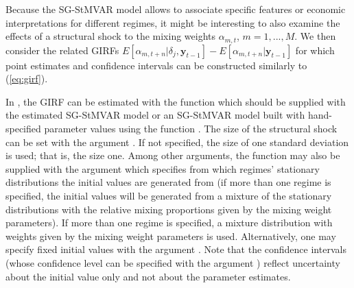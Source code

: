 \documentclass[nojss]{jss} %
\begin{document}
Because the SG-StMVAR model allows to associate specific features or economic interpretations for different regimes, it might be interesting to also examine the effects of a structural shock to the mixing weights $\alpha_{m,t}$, $m=1,...,M$. We then consider the related GIRFs $E[\alpha_{m,t+n}|\delta_j,\boldsymbol{y}_{t-1}] - E[\alpha_{m,t+n}|\boldsymbol{y}_{t-1}]$ for which point estimates and confidence intervals can be constructed similarly to (\ref{eq:girf}).

In , the GIRF can be estimated with the function  which should be supplied with the estimated SG-StMVAR model or an SG-StMVAR model built with hand-specified parameter values using the function . The size of the structural shock can be set with the argument . If not specified, the size of one standard deviation is used; that is, the size one. Among other arguments, the function may also be supplied with the argument  which specifies from which regimes' stationary distributions the initial values are generated from (if more than one regime is specified, the initial values will be generated from a mixture of the stationary distributions with the relative mixing proportions given by the mixing weight parameters). If more than one regime is specified, a mixture distribution with weights given by the mixing weight parameters is used. Alternatively, one may specify fixed initial values with the argument . Note that the confidence intervals (whose confidence level can be specified with the argument ) reflect uncertainty about the initial value only and not about the parameter estimates.
\end{document}
